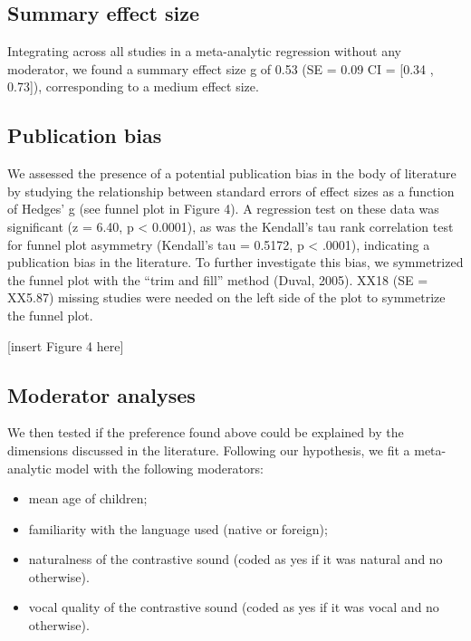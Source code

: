 \documentclass[man]{apa6}
\providecommand{\tightlist}{%
  \setlength{\itemsep}{0pt}\setlength{\parskip}{0pt}}
\begin{document}
\subsection{Summary effect size}\label{summary-effect-size}

Integrating across all studies in a meta-analytic regression without any
moderator, we found a summary effect size g of 0.53 (SE = 0.09 CI =
{[}0.34 , 0.73{]}), corresponding to a medium effect size.

\subsection{Publication bias}\label{publication-bias}

We assessed the presence of a potential publication bias in the body of
literature by studying the relationship between standard errors of
effect sizes as a function of Hedges' g (see funnel plot in Figure 4). A
regression test on these data was significant (z = 6.40, p \textless{}
0.0001), as was the Kendall's tau rank correlation test for funnel plot
asymmetry (Kendall's tau = 0.5172, p \textless{} .0001), indicating a
publication bias in the literature. To further investigate this bias, we
symmetrized the funnel plot with the \enquote{trim and fill} method
(Duval, 2005). XX18 (SE = XX5.87) missing studies were needed on the
left side of the plot to symmetrize the funnel plot.

{[}insert Figure 4 here{]}

\subsection{Moderator analyses}\label{moderator-analyses}

We then tested if the preference found above could be explained by the
dimensions discussed in the literature. Following our hypothesis, we fit
a meta-analytic model with the following moderators:

\begin{itemize}
\tightlist
\item
  mean age of children;
\item
  familiarity with the language used (native or foreign);
\item
  naturalness of the contrastive sound (coded as yes if it was natural
  and no otherwise).
\item
  vocal quality of the contrastive sound (coded as yes if it was vocal
  and no otherwise).
\end{itemize}
\end{document}
